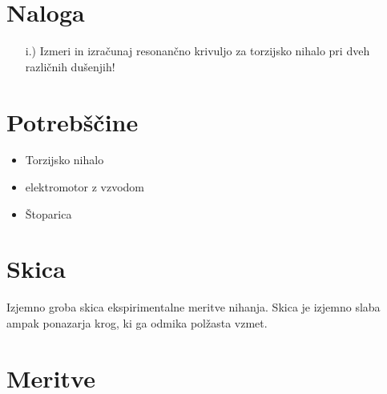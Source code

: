 \graphicspath{ {./slike/} }
\section{Naloga}\label{sec:jedro}
%
\begin{enumerate}
    \item[i.)] Izmeri in izračunaj resonančno krivuljo za torzijsko nihalo pri dveh različnih dušenjih!
\end{enumerate}

\section{Potrebščine}
\begin{itemize}
    \item Torzijsko nihalo
    \item elektromotor z vzvodom
    \item Štoparica
\end{itemize}

\section{Skica}
Izjemno groba skica ekspirimentalne meritve nihanja. Skica je izjemno slaba ampak ponazarja krog, ki ga odmika polžasta vzmet.


\section{Meritve}

